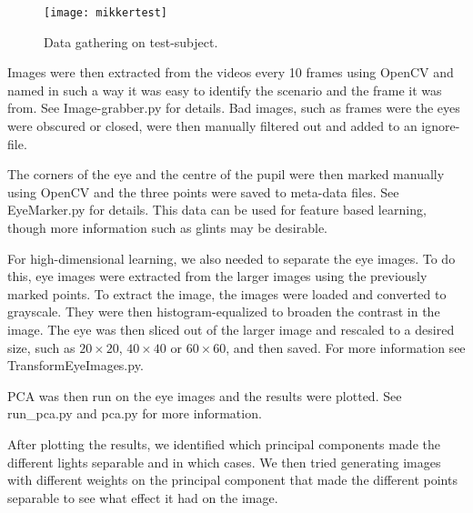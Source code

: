 \begin{figure}
\centering
\texttt{[image: mikkertest]}
\caption{Data gathering on test-subject.}
\label{fig:mikkertest}
\end{figure}


Images were then extracted from the videos every 10 frames using OpenCV and named in such a way it was easy to identify the scenario and the frame it was from.
See Image-grabber.py for details. %
Bad images, such as frames were the eyes were obscured or closed, were then manually filtered out and added to an ignore-file.

The corners of the eye and the centre of the pupil were then marked manually using OpenCV and the three points were saved to meta-data files. See EyeMarker.py for details.
This data can be used for feature based learning, though more information such as glints may be desirable.  %

For high-dimensional learning, we also needed to separate the eye images.
To do this, eye images were extracted from the larger images using the previously marked points.
To extract the image, the images were loaded and converted to grayscale.
They were then histogram-equalized to broaden the contrast in the image. %
The eye was then sliced out of the larger image and rescaled to a desired size, such as $20\times 20$, $40\times 40$ or $60\times 60$, and then saved.
For more information see TransformEyeImages.py. %

PCA was then run on the eye images %
and the results were plotted. See run\_pca.py and pca.py for more information. %

After plotting the results, we identified which principal components made the different lights separable and in which cases.
We then tried generating images with different weights on the principal component that made the different points separable to see what effect it had on the image.